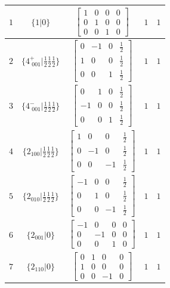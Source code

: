 \documentclass[fleqn,8pt]{jsarticle}
\begin{document}
\begin{longtable}{ccccc}
$ 1 $ & $ \{1|0\} $ & $ \begin{bmatrix} 1 & 0 & 0 & 0 \\ 0 & 1 & 0 & 0 \\ 0 & 0 & 1 & 0 \end{bmatrix} $ & $ 1 $ & $ 1 $ \\ \hline
$ 2 $ & $ \{4^{+}_{\,\,001}|\frac{1}{2} \frac{1}{2} \frac{1}{2}\} $ & $ \begin{bmatrix} 0 & -1 & 0 & \frac{1}{2} \\ 1 & 0 & 0 & \frac{1}{2} \\ 0 & 0 & 1 & \frac{1}{2} \end{bmatrix} $ & $ 1 $ & $ 1 $ \\ \hline
$ 3 $ & $ \{4^{-}_{\,\,001}|\frac{1}{2} \frac{1}{2} \frac{1}{2}\} $ & $ \begin{bmatrix} 0 & 1 & 0 & \frac{1}{2} \\ -1 & 0 & 0 & \frac{1}{2} \\ 0 & 0 & 1 & \frac{1}{2} \end{bmatrix} $ & $ 1 $ & $ 1 $ \\ \hline
$ 4 $ & $ \{2{}_{100}|\frac{1}{2} \frac{1}{2} \frac{1}{2}\} $ & $ \begin{bmatrix} 1 & 0 & 0 & \frac{1}{2} \\ 0 & -1 & 0 & \frac{1}{2} \\ 0 & 0 & -1 & \frac{1}{2} \end{bmatrix} $ & $ 1 $ & $ 1 $ \\ \hline
$ 5 $ & $ \{2{}_{010}|\frac{1}{2} \frac{1}{2} \frac{1}{2}\} $ & $ \begin{bmatrix} -1 & 0 & 0 & \frac{1}{2} \\ 0 & 1 & 0 & \frac{1}{2} \\ 0 & 0 & -1 & \frac{1}{2} \end{bmatrix} $ & $ 1 $ & $ 1 $ \\ \hline
$ 6 $ & $ \{2{}_{001}|0\} $ & $ \begin{bmatrix} -1 & 0 & 0 & 0 \\ 0 & -1 & 0 & 0 \\ 0 & 0 & 1 & 0 \end{bmatrix} $ & $ 1 $ & $ 1 $ \\ \hline
$ 7 $ & $ \{2{}_{110}|0\} $ & $ \begin{bmatrix} 0 & 1 & 0 & 0 \\ 1 & 0 & 0 & 0 \\ 0 & 0 & -1 & 0 \end{bmatrix} $ & $ 1 $ & $ 1 $ \\ \hline

\end{longtable}
\end{document}

